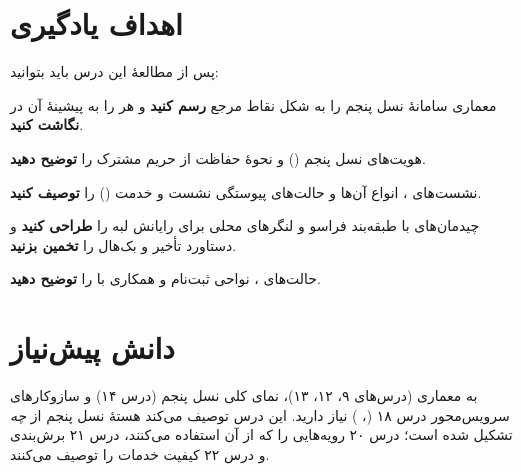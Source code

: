 \documentclass[11pt,a4paper]{article}
\begin{document}
\ACNcover

\section{اهداف یادگیری}
پس از مطالعهٔ این درس باید بتوانید:
\begin{objectives}
  \item معماری سامانهٔ نسل پنجم را به شکل نقاط مرجع \textbf{رسم کنید} و هر  را به پیشینهٔ آن در 
        \textbf{نگاشت کنید}.
  \item هویت‌های نسل پنجم () و نحوهٔ حفاظت  از حریم مشترک را \textbf{توضیح دهید}.
  \item نشست‌های ، انواع آن‌ها و حالت‌های پیوستگی نشست و خدمت () را \textbf{توصیف کنید}.
  \item چیدمان‌های  با طبقه‌بند فراسو و لنگرهای محلی برای رایانش لبه را \textbf{طراحی کنید} و دستاورد تأخیر و بک‌هال را
        \textbf{تخمین بزنید}.
  \item حالت‌های ، نواحی ثبت‌نام و همکاری با  را \textbf{توضیح دهید}.
\end{objectives}

\section{دانش پیش‌نیاز}
به معماری  (درس‌های ۹، ۱۲، ۱۳)، نمای کلی نسل پنجم (درس ۱۴) و سازوکارهای سرویس‌محور درس ۱۸ (، )
نیاز دارید. این درس توصیف می‌کند هستهٔ نسل پنجم از \emph{چه} تشکیل شده است؛ درس ۲۰ رویه‌هایی را که از آن استفاده می‌کنند، درس ۲۱
برش‌بندی و درس ۲۲ کیفیت خدمات را توصیف می‌کنند.
\end{document}
